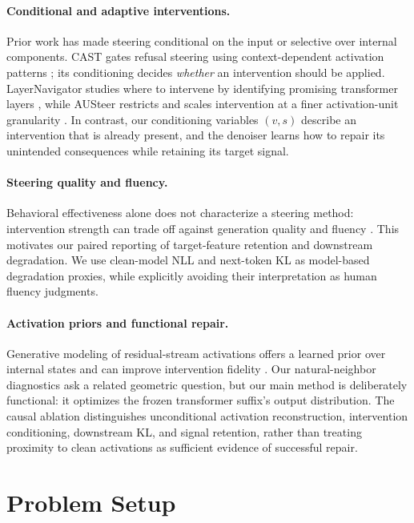 \documentclass[11pt,twocolumn]{article}
\begin{document}
\paragraph{Conditional and adaptive interventions.}
Prior work has made steering conditional on the input or selective over internal components. CAST gates refusal steering using context-dependent activation patterns \citep{lee2025cast}; its conditioning decides \emph{whether} an intervention should be applied. LayerNavigator studies where to intervene by identifying promising transformer layers \citep{sun2025layernavigator}, while AUSteer restricts and scales intervention at a finer activation-unit granularity \citep{feng2026austeer}. In contrast, our conditioning variables $(v,s)$ describe an intervention that is already present, and the denoiser learns how to repair its unintended consequences while retaining its target signal.

\paragraph{Steering quality and fluency.}
Behavioral effectiveness alone does not characterize a steering method: intervention strength can trade off against generation quality and fluency \citep{macocco2026tradeoff}. This motivates our paired reporting of target-feature retention and downstream degradation. We use clean-model NLL and next-token KL as model-based degradation proxies, while explicitly avoiding their interpretation as human fluency judgments.

\paragraph{Activation priors and functional repair.}
Generative modeling of residual-stream activations offers a learned prior over internal states and can improve intervention fidelity \citep{luo2026glp}. Our natural-neighbor diagnostics ask a related geometric question, but our main method is deliberately functional: it optimizes the frozen transformer suffix's output distribution. The causal ablation distinguishes unconditional activation reconstruction, intervention conditioning, downstream KL, and signal retention, rather than treating proximity to clean activations as sufficient evidence of successful repair.

\section{Problem Setup}
\end{document}
